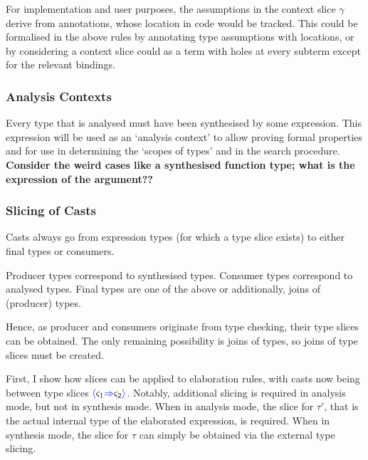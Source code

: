 For implementation and user purposes, the assumptions in the context slice $\gamma$ derive from annotations, whose location in code would be tracked. This could be formalised in the above rules by annotating type assumptions with locations, or by considering a context slice could as a term with holes at every subterm except for the relevant bindings.\par 

\subsubsection{Analysis Contexts}
Every type that is analysed must have been synthesised by some expression. This expression will be used as an `analysis context' to allow proving formal properties and for use in determining the `scopes of types' and in the search procedure. \textbf{Consider the weird cases like a synthesised function type; what is the expression of the argument??}

\subsubsection{Slicing of Casts}
Casts always go from expression types (for which a type slice exists) to either final types or consumers.\par 
Producer types correspond to synthesised types. Consumer types correspond to analysed types. Final types are one of the above or additionally, joins of (producer) types.\par 
\par 
Hence, as producer and consumers originate from type checking, their type slices can be obtained. The only remaining possibility is joins of types, so joins of type slices must be created.\par 
First, I show how slices can be applied to elaboration rules, with casts now being between type slices ${\color{blue}\langle} \varsigma_1 {\color{blue}\Rightarrow} \varsigma_2 {\color{blue}\rangle}$. Notably, additional slicing is required in analysis mode, but not in synthesis mode. When in analysis mode, the slice for $\tau'$, that is the actual internal type of the elaborated expression, is required. When in synthesis mode, the slice for $\tau$ can simply be obtained via the external type slicing. 

